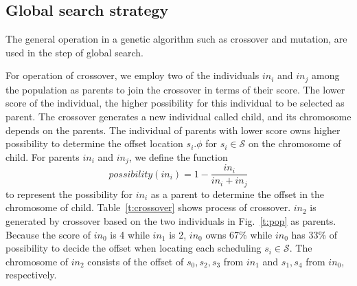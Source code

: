 \documentclass[10pt,journal]{IEEEtran}
\newcommand{\calS}{\mathcal{S}}
\theoremstyle{remark}
\begin{document}
\subsection{Global search strategy \label{s:glo}}

The general operation in a genetic algorithm such as crossover and mutation,
  are used in the step of global search. 

For operation of crossover,
 we employ two of the individuals $in_i$ and $in_j$ among the population as parents to join the crossover in terms of their score.
The lower score of the individual,
 the higher possibility for this individual to be selected as parent.
The crossover generates a new individual called child, and its chromosome depends on the parents.
The individual of parents with lower score owns higher possibility to determine the offset location $s_i.\phi$ for $s_i\in\calS$ on the chromosome of child.
For parents $in_i$ and $in_j$, we define the function
\begin{equation*}
	possibility(in_i)=1-\frac{in_i}{in_i+in_j}
\end{equation*}
to represent the possibility for $in_i$ as a parent to determine the offset in the chromosome of child.
Table~\ref{t:crossover} shows process of crossover.
$in_2$ is generated by crossover based on the two individuals in Fig.~\ref{t:pop} as parents.
Because the score of $in_0$ is 4 while $in_1$ is 2,
 $in_0$ owns 67\% while $in_0 $ has 33\% of possibility to decide the offset when locating each scheduling $s_i\in\calS$.
The chromosome of $in_2$ consists of the offset of $s_0,s_2,s_3$ from $in_1$ and $s_1,s_4$ from $in_0$, respectively.
\end{document}
